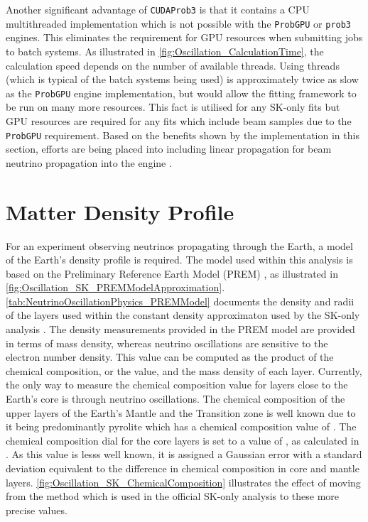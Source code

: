 Another significant advantage of \texttt{CUDAProb3} is that it contains a CPU multithreaded implementation which is not possible with the \texttt{ProbGPU} or \texttt{prob3} engines. This eliminates the requirement for GPU resources when submitting jobs to batch systems. As illustrated in \autoref{fig:Oscillation_CalculationTime}, the calculation speed depends on the number of available threads. Using  threads (which is typical of the batch systems being used) is approximately twice as slow as the \texttt{ProbGPU} engine implementation, but would allow the fitting framework to be run on many more resources. This fact is utilised for any SK-only fits but GPU resources are required for any fits which include beam samples due to the \texttt{ProbGPU} requirement. Based on the benefits shown by the implementation in this section, efforts are being placed into including linear propagation for beam neutrino propagation into the engine \cite{Liban}.

\section{Matter Density Profile}
\label{sec:Oscillation_MatterDensity}


For an experiment observing neutrinos propagating through the Earth, a model of the Earth's density profile is required. The model used within this analysis is based on the Preliminary Reference Earth Model (PREM) \cite{Dziewonski1981-sp}, as illustrated in \autoref{fig:Oscillation_SK_PREMModelApproximation}. \autoref{tab:NeutrinoOscillationPhysics_PREMModel} documents the density and radii of the layers used within the constant density approximaton used by the SK-only analysis \cite{thesis_roger}. The density measurements provided in the PREM model are provided in terms of mass density, whereas neutrino oscillations are sensitive to the electron number density. This value can be computed as the product of the chemical composition, or the  value, and the mass density of each layer. Currently, the only way to measure the chemical composition value for layers close to the Earth's core is through neutrino oscillations. The chemical composition of the upper layers of the Earth's Mantle and the Transition zone is well known due to it being predominantly pyrolite which has a chemical composition value of  \cite{Bourret_2017}. The chemical composition dial for the core layers is set to a value of , as calculated in \cite{Rott2015}. As this value is lesss well known, it is assigned a Gaussian error with a standard deviation equivalent to the difference in chemical composition in core and mantle layers. \autoref{fig:Oscillation_SK_ChemicalComposition} illustrates the effect of moving from the  method which is used in the official SK-only analysis to these more precise values.

